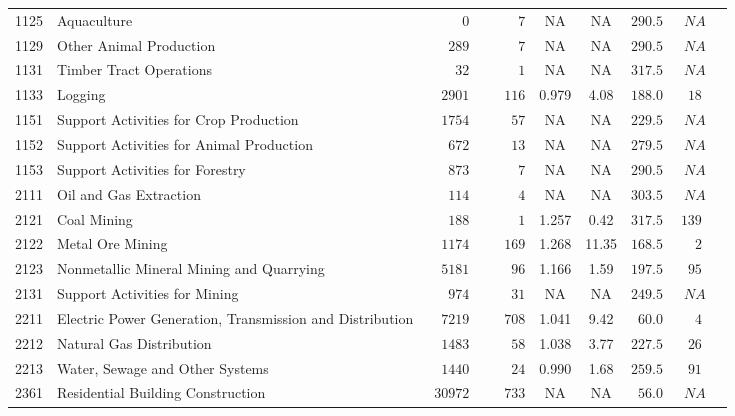 \documentclass[9pt, oneside]{article}   	%
\begin{document}
\begin{longtable}{lp{3 in}ccccccc}
1125  & Aquaculture & $\phantom{00000}0$ & $\phantom{00000}7$ &    NA &    NA & $290.5$ & $\phantom{0}NA$ \\
1129  & Other Animal Production & $\phantom{000}289$ & $\phantom{00000}7$ &    NA &    NA & $290.5$ & $\phantom{0}NA$ \\
1131  & Timber Tract Operations & $\phantom{0000}32$ & $\phantom{00000}1$ &    NA &    NA & $317.5$ & $\phantom{0}NA$ \\
1133  & Logging & $\phantom{00}2901$ & $\phantom{000}116$ & 0.979 &  4.08 & $188.0$ & $\phantom{0}18$ \\
1151  & Support Activities for Crop Production & $\phantom{00}1754$ & $\phantom{0000}57$ &    NA &    NA & $229.5$ & $\phantom{0}NA$ \\
1152  & Support Activities for Animal Production & $\phantom{000}672$ & $\phantom{0000}13$ &    NA &    NA & $279.5$ & $\phantom{0}NA$ \\
1153  & Support Activities for Forestry & $\phantom{000}873$ & $\phantom{00000}7$ &    NA &    NA & $290.5$ & $\phantom{0}NA$ \\
2111  & Oil and Gas Extraction & $\phantom{000}114$ & $\phantom{00000}4$ &    NA &    NA & $303.5$ & $\phantom{0}NA$ \\
2121  & Coal Mining & $\phantom{000}188$ & $\phantom{00000}1$ & 1.257 &  0.42 & $317.5$ & $139$ \\
2122  & Metal Ore Mining & $\phantom{00}1174$ & $\phantom{000}169$ & 1.268 & 11.35 & $168.5$ & $\phantom{00}2$ \\
2123  & Nonmetallic Mineral Mining and Quarrying & $\phantom{00}5181$ & $\phantom{0000}96$ & 1.166 &  1.59 & $197.5$ & $\phantom{0}95$ \\
2131  & Support Activities for Mining & $\phantom{000}974$ & $\phantom{0000}31$ &    NA &    NA & $249.5$ & $\phantom{0}NA$ \\
2211  & Electric Power Generation, Transmission and Distribution & $\phantom{00}7219$ & $\phantom{000}708$ & 1.041 &  9.42 & $\phantom{0}60.0$ & $\phantom{00}4$ \\
2212  & Natural Gas Distribution & $\phantom{00}1483$ & $\phantom{0000}58$ & 1.038 &  3.77 & $227.5$ & $\phantom{0}26$ \\
2213  & Water, Sewage and Other Systems & $\phantom{00}1440$ & $\phantom{0000}24$ & 0.990 &  1.68 & $259.5$ & $\phantom{0}91$ \\
2361  & Residential Building Construction & $\phantom{0}30972$ & $\phantom{000}733$ &    NA &    NA & $\phantom{0}56.0$ & $\phantom{0}NA$ \\

\end{longtable}
\end{document}
